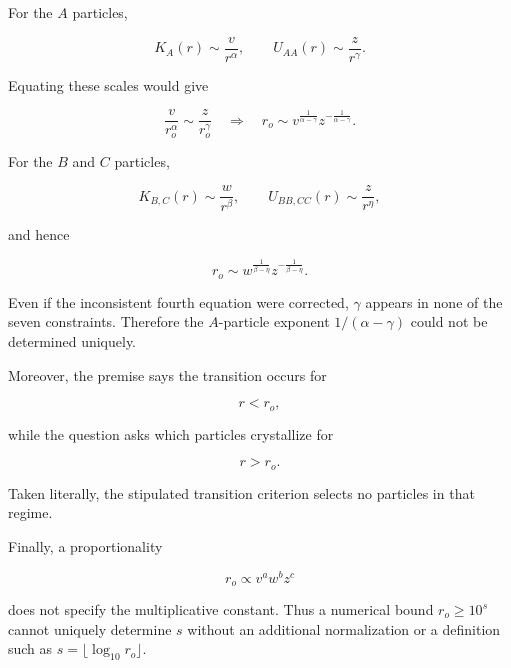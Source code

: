 For the $A$ particles,

\[
K_A(r)\sim \frac{v}{r^\alpha}, \qquad U_{AA}(r)\sim \frac{z}{r^\gamma}.
\]

Equating these scales would give

\[
\frac{v}{r_o^\alpha}\sim\frac{z}{r_o^\gamma} \quad\Longrightarrow\quad r_o\sim v^{\frac1{\alpha-\gamma}} z^{-\frac1{\alpha-\gamma}}.
\]

For the $B$ and $C$ particles,

\[
K_{B,C}(r)\sim\frac{w}{r^\beta}, \qquad U_{BB,CC}(r)\sim\frac{z}{r^\eta},
\]

and hence

\[
r_o\sim w^{\frac1{\beta-\eta}} z^{-\frac1{\beta-\eta}}.
\]

Even if the inconsistent fourth equation were corrected, $\gamma$ appears in none of the seven constraints. Therefore the $A$-particle exponent $1/(\alpha-\gamma)$ could not be determined uniquely.

Moreover, the premise says the transition occurs for

\[
r<r_o,
\]

while the question asks which particles crystallize for

\[
r>r_o.
\]

Taken literally, the stipulated transition criterion selects no particles in that regime.

Finally, a proportionality

\[
r_o\propto v^a w^b z^c
\]

does not specify the multiplicative constant. Thus a numerical bound $r_o\geq 10^s$ cannot uniquely determine $s$ without an additional normalization or a definition such as $s=\lfloor\log_{10}r_o\rfloor$.
